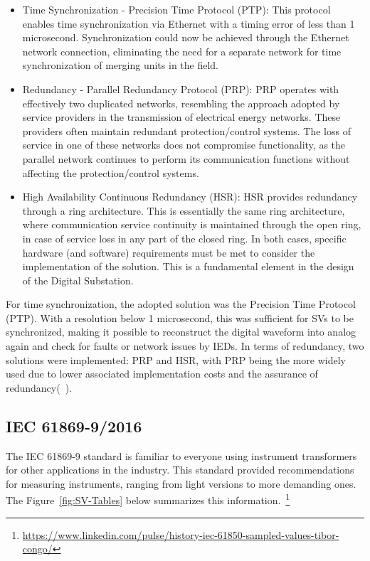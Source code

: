 \begin{itemize}
	\item Time Synchronization - Precision Time Protocol (PTP): This protocol enables time synchronization via Ethernet with a timing error of less than 1 microsecond. Synchronization could now be achieved through the Ethernet network connection, eliminating the need for a separate network for time synchronization of merging units in the field.
	\item Redundancy - Parallel Redundancy Protocol (PRP): PRP operates with effectively two duplicated networks, resembling the approach adopted by service providers in the transmission of electrical energy networks. These providers often maintain redundant protection/control systems. The loss of service in one of these networks does not compromise functionality, as the parallel network continues to perform its communication functions without affecting the protection/control systems.
	\item High Availability Continuous Redundancy (HSR): HSR provides redundancy through a ring architecture. This is essentially the same ring architecture, where communication service continuity is maintained through the open ring, in case of service loss in any part of the closed ring. In both cases, specific hardware (and software) requirements must be met to consider the implementation of the solution. This is a fundamental element in the design of the Digital Substation.
\end{itemize}

For time synchronization, the adopted solution was the Precision Time Protocol (PTP). With a resolution below 1 microsecond, this was sufficient for SVs to be synchronized, making it possible to reconstruct the digital waveform into analog again and check for faults or network issues by IEDs. In terms of redundancy, two solutions were implemented: PRP and HSR, with PRP being the more widely used due to lower associated implementation costs and the assurance of redundancy(~\cite{History_Sample_Value}).

\subsection{IEC 61869-9/2016}

The IEC 61869-9 standard is familiar to everyone using instrument transformers for other applications in the industry. This standard provided recommendations for measuring instruments, ranging from light versions to more demanding ones. The Figure~\ref{fig:SV-Tables} below summarizes this information.~\footnote{\url{https://www.linkedin.com/pulse/history-iec-61850-sampled-values-tibor-congo/}}

